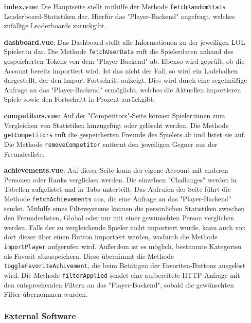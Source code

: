 \textbf{index.vue}: Die Hauptseite stellt mithilfe der Methode \verb|fetchRandomStats| Leaderboard-Statistiken dar. Hierfür das "Player-Backend" angefragt, welches zufällige 
Leaderboards zurückgibt.
\newline

\textbf{dashboard.vue}: Das Dashboard stellt alle Informationen zu der jeweiligen LOL-Spieler:in dar. Die Methode \verb|fetchUserData| ruft die Spielerdaten anhand des gespeicherten Tokens
von dem "Player-Backend" ab. Ebenso wird geprüft, ob die Account bereits importiert wird. Ist das nicht der Fall, so wird ein Ladebalken dargestellt, der den Import-Fortschritt aufzeigt. Dies
wird durch eine regelmäßige Anfrage an das "Player-Backend" ermöglicht, welches die Aktuellen importieren Spiele sowie den Fortschritt in Prozent zurückgibt.
\newline

\textbf{competitors.vue}: Auf der "Competitors"-Seite können Spieler:innen zum Vergleichen von Statistiken hinzugefügt oder gelöscht werden. Die Methode \verb|getCompetitors| ruft die gespeicherten
Freunde des Spielers ab und listet sie auf. Die Methode \verb|removeCompetitor| entfernt den jeweiligen Gegner aus der Freundesliste.
\newline

\textbf{achievements.vue}: Auf dieser Seite kann der eigene Account mit anderen Personen oder Ranks verglichen werden. Die einzelnen "Challanges" werden in Tabellen aufgelistet und in Tabs unterteilt.
Das Aufrufen der Seite führt die Methode \verb|fetchAchievements| aus, die eine Anfrage an das "Player-Backend" sendet. Mithilfe eines Filtersystems können die persönlichen
Statistiken zwischen den Freundeslisten, Global oder nur mit einer gewünschten Person verglichen werden. Falls der zu vergleichende Spieler nicht importiert wurde, kann auch von dort dieser über einen 
Button importiert werden, wodurch die Methode \verb|importPlayer| aufgerufen wird. Außerdem ist es möglich, bestimmte Kategorien als Favorit abzuspeichern. Diese übernimmt die Methode
\verb|toggleFavoriteAchivement|, die beim Betätigen der Favoriten-Buttons ausgelöst wird. Die Methode \verb|filterApplied| sendet eine aufbereitete HTTP-Anfrage mit den entsprechenden Filtern
an das "Player-Backend", sobald die gewünschten Filter übernommen wurden.
\newline

\subsubsection{External Software}